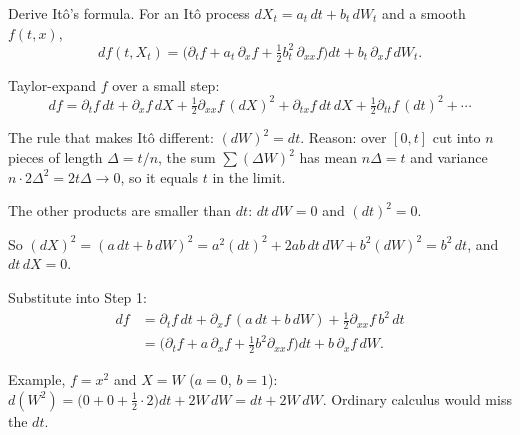 \begin{problem}[Q2(b)]
Derive Itô's formula.
\cardsays For an Itô process $dX_t=a_t\,dt+b_t\,dW_t$ and a smooth $f(t,x)$,
\[
df(t,X_t)=\Big(\partial_tf+a_t\,\partial_xf+\tfrac12b_t^2\,\partial_{xx}f\Big)dt+b_t\,\partial_xf\,dW_t.
\]
\working
\begin{steps}
\item Taylor-expand $f$ over a small step:
\[
df=\partial_tf\,dt+\partial_xf\,dX+\tfrac12\partial_{xx}f\,(dX)^2+\partial_{tx}f\,dt\,dX+\tfrac12\partial_{tt}f\,(dt)^2+\cdots
\]
\item The rule that makes Itô different: $(dW)^2=dt$. Reason: over $[0,t]$ cut into $n$ pieces of length $\Delta=t/n$, the sum $\sum(\Delta W)^2$ has mean $n\Delta=t$ and variance $n\cdot2\Delta^2=2t\Delta\to0$, so it equals $t$ in the limit.
\item The other products are smaller than $dt$: $dt\,dW=0$ and $(dt)^2=0$.
\item So $(dX)^2=(a\,dt+b\,dW)^2=a^2(dt)^2+2ab\,dt\,dW+b^2(dW)^2=b^2\,dt$, and $dt\,dX=0$.
\item Substitute into Step 1:
\[
\begin{aligned}
df&=\partial_tf\,dt+\partial_xf\,(a\,dt+b\,dW)+\tfrac12\partial_{xx}f\,b^2\,dt\\
&=\Big(\partial_tf+a\,\partial_xf+\tfrac12b^2\partial_{xx}f\Big)dt+b\,\partial_xf\,dW.
\end{aligned}
\]
\item Example, $f=x^2$ and $X=W$ ($a=0$, $b=1$): $d(W^2)=\big(0+0+\frac12\cdot2\big)dt+2W\,dW=dt+2W\,dW$. Ordinary calculus would miss the $dt$.
\end{steps}
\end{problem}

